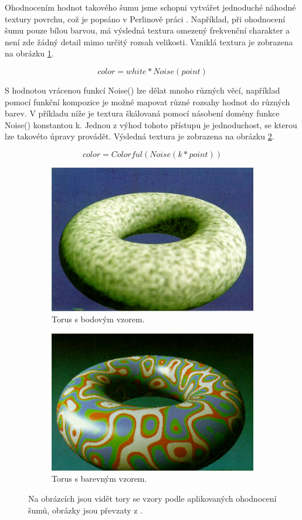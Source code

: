 Ohodnocením hodnot takového šumu jsme schopni vytvářet jednoduché náhodné textury povrchu, což je popsáno v Perlinově práci \cite{PerlinKen}. Například, při ohodnocení šumu pouze bílou barvou, má výsledná textura omezený frekvenční charakter a není zde žádný detail mimo určitý rozsah velikosti. Vzniklá textura je zobrazena na obrázku \ref{SpottedDoughnut}.

\[color = white * Noise(point)\]

S hodnotou vrácenou funkcí Noise() \cite{Perlin2002ImprovingN} lze dělat mnoho různých věcí, například pomocí funkční kompozice je možné mapovat různé rozsahy hodnot do různých barev. V příkladu níže je textura škálovaná pomocí násobení domény funkce Noise() konstantou k. Jednou z výhod tohoto přístupu je jednoduchost, se kterou lze takovéto úpravy provádět. Výsledná textura je zobrazena na obrázku \ref{ColoredDoughnut}.

\[color = Colorful(Noise(k * point))\]

\begin{figure}[H]
	\centering
	\begin{subfigure}{0.5\textwidth}
		\centering
		\includegraphics[scale=0.475]{obrazky-figures/SpottedDoughnut.png}
		\caption{Torus s bodovým vzorem.}
		\label{SpottedDoughnut}
	\end{subfigure}
	\begin{subfigure}{0.4\textwidth}
		\centering
		\includegraphics[scale=0.5]{obrazky-figures/ColoredDoughnut.png}
		\caption{Torus s barevným vzorem.}
		\label{ColoredDoughnut}
	\end{subfigure}
	\caption{Na obrázcích jsou vidět tory se vzory podle aplikovaných ohodnocení šumů, obrázky jsou převzaty z \cite{PerlinKen}.}
	\label{Doughnuts}
\end{figure}

